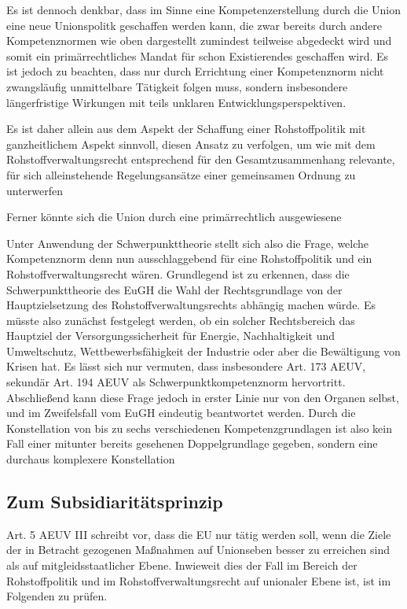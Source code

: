 \documentclass[12pt,a4paper,oneside]{book} %
\begin{document}
{	Es ist dennoch denkbar, dass im Sinne eine Kompetenzerstellung durch die Union eine neue Unionspolitk geschaffen werden kann, die zwar bereits durch andere Kompetenznormen wie oben dargestellt zumindest teilweise abgedeckt wird und somit ein primärrechtliches Mandat für schon Existierendes geschaffen wird. Es ist jedoch zu beachten, dass nur durch Errichtung einer Kompetenznorm nicht zwangsläufig unmittelbare Tätigkeit folgen muss, sondern insbesondere längerfristige Wirkungen mit teils unklaren Entwicklungsperspektiven.\autocite[siehe hierzu Nettesheim Art. 194 En 40]{grabitz_recht_2024}
	
	Es ist daher allein aus dem Aspekt der Schaffung einer Rohstoffpolitik mit ganzheitlichem Aspekt sinnvoll, diesen Ansatz zu verfolgen, um wie mit dem Rohstoffverwaltungsrecht entsprechend für den Gesamtzusammenhang relevante, für sich alleinstehende Regelungsansätze einer gemeinsamen Ordnung zu unterwerfen
	
	Ferner könnte sich die Union durch eine primärrechtlich ausgewiesene
	
	Unter Anwendung der Schwerpunkttheorie stellt sich also die Frage, welche Kompetenznorm denn nun ausschlaggebend für eine Rohstoffpolitik und ein Rohstoffverwaltungsrecht wären. Grundlegend ist zu erkennen, dass die Schwerpunkttheorie des EuGH die Wahl der Rechtsgrundlage von der Hauptzielsetzung des Rohstoffverwaltungsrechts abhängig machen würde. Es müsste also zunächst festgelegt werden, ob ein solcher Rechtsbereich das Hauptziel der Versorgungssicherheit für Energie, Nachhaltigkeit und Umweltschutz, Wettbewerbsfähigkeit der Industrie oder aber die Bewältigung von Krisen hat. Es lässt sich nur vermuten, dass insbesondere Art. 173 AEUV, sekundär Art. 194 AEUV als Schwerpunktkompetenznorm hervortritt. Abschließend kann diese Frage jedoch in erster Linie nur von den Organen selbst, und im Zweifelsfall vom EuGH eindeutig beantwortet werden. Durch die Konstellation von bis zu sechs verschiedenen Kompetenzgrundlagen ist also kein Fall einer mitunter bereits gesehenen Doppelgrundlage gegeben, sondern eine durchaus komplexere Konstellation
	
	\subsection{Zum Subsidiaritätsprinzip}
	Art. 5 AEUV III schreibt vor, dass die EU nur tätig werden soll, wenn die Ziele der in Betracht gezogenen Maßnahmen auf Unionseben besser zu erreichen sind als auf mitgleidsstaatlicher Ebene. Inwieweit dies der Fall im Bereich der Rohstoffpolitik und im Rohstoffverwaltungsrecht auf unionaler Ebene ist, ist im Folgenden zu prüfen.
	
}
\end{document}
